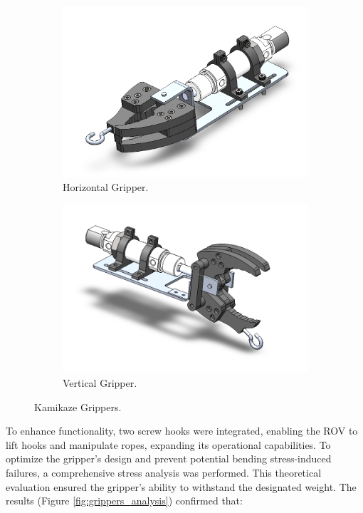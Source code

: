 \begin{figure}[h]
    \centering
    \begin{subfigure}[b]{0.49\columnwidth}
        \includegraphics[width=\textwidth]{Sections/2Design Rationale/images/Horizontal.png}
        \caption{Horizontal Gripper.}
        \label{fig:horizontal_gripper}
    \end{subfigure}
    \hfill
    \begin{subfigure}[b]{0.49\columnwidth}
        \includegraphics[width=\textwidth]{Sections/2Design Rationale/images/Vertical.png}
        \caption{Vertical Gripper.}
        \label{fig:vertical_gripper}
    \end{subfigure}
    \caption{Kamikaze Grippers.}
    \label{fig:grippers}
\end{figure}

To enhance functionality, two screw hooks were integrated, enabling the ROV to lift hooks and manipulate ropes, expanding its operational capabilities. To optimize the gripper’s design and prevent potential bending stress-induced failures, a comprehensive stress analysis was performed. This theoretical evaluation ensured the gripper’s ability to withstand the designated weight. The results (Figure \ref{fig:grippers_analysis}) confirmed that:

